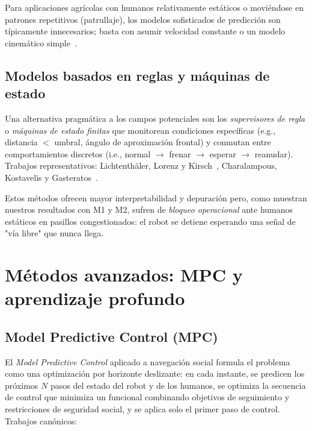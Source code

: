\documentclass[12pt,a4paper,oneside]{book}
\begin{document}
Para aplicaciones agrícolas con humanos relativamente estáticos o moviéndose en patrones repetitivos (patrullaje), los modelos sofisticados de predicción son típicamente innecesarios; basta con asumir velocidad constante o un modelo cinemático simple~\cite{Schulz2003}.

\subsection{Modelos basados en reglas y máquinas de estado}

Una alternativa pragmática a los campos potenciales son los \emph{supervisores de regla} o \emph{máquinas de estado finitas} que monitorean condiciones específicas (e.g., distancia $<$ umbral, ángulo de aproximación frontal) y conmutan entre comportamientos discretos (i.e., normal $\to$ frenar $\to$ esperar $\to$ reanudar). Trabajos representativos: Lichtenthäler, Lorenz y Kirsch~\cite{Lichtenthaler2012}, Charalampous, Kostavelis y Gasteratos~\cite{Charalampous2017}.

Estos métodos ofrecen mayor interpretabilidad y depuración pero, como muestran nuestros resultados con M1 y M2, sufren de \emph{bloqueo operacional} ante humanos estáticos en pasillos congestionados: el robot se detiene esperando una señal de "vía libre" que nunca llega.

\newpage
\section{Métodos avanzados: MPC y aprendizaje profundo}
\label{doc7:sec:advanced}

\subsection{Model Predictive Control (MPC)}

El \emph{Model Predictive Control} aplicado a navegación social formula el problema como una optimización por horizonte deslizante: en cada instante, se predicen los próximos $N$ pasos del estado del robot y de los humanos, se optimiza la secuencia de control que minimiza un funcional combinando objetivos de seguimiento y restricciones de seguridad social, y se aplica solo el primer paso de control. Trabajos canónicos:
\end{document}
